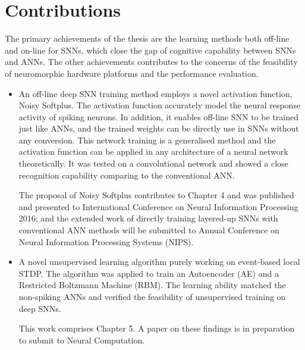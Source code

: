 \section{Contributions}
The primary achievements of the thesis are the learning methods both off-line and on-line for SNNs, which close the gap of cognitive capability between SNNs and ANNs.
The other achievements contributes to the concerns of the feasibility of neuromorphic hardware platforms and the performance evaluation.
\begin{itemize}
%	
	
	\item 
	An off-line deep SNN training method employs a novel activation function, Noisy Softplus.
	The activation function accurately model the neural response activity of spiking neurons.
	In addition, it enables off-line SNN to be trained just like ANNs, and the trained weights can be directly use in SNNs without any conversion.
	This network training is a generalised method and the activation function can be applied in any architecture of a neural network theoretically.
	It was tested on a convolutional network and showed a close recognition capability comparing to the conventional ANN. 

	The proposal of Noisy Softplus contributes to Chapter 4 and was published and presented to International Conference on Neural Information Processing 2016;
	and the extended work of directly training layered-up SNNs with conventional ANN methods will be submitted to Annual Conference on Neural Information Processing Systems (NIPS).

	\item 
	A novel unsupervised learning algorithm purely working on event-based local STDP.
	The algorithm was applied to train an Autoencoder (AE) and a Restricted Boltzmann Machine (RBM).
	The learning ability matched the non-spiking ANNs and verified the feasibility of unsupervised training on deep SNNs. 
	
	This work comprises Chapter 5.
	A paper on these findings is in preparation to submit to Neural Computation.
	

\end{itemize}
